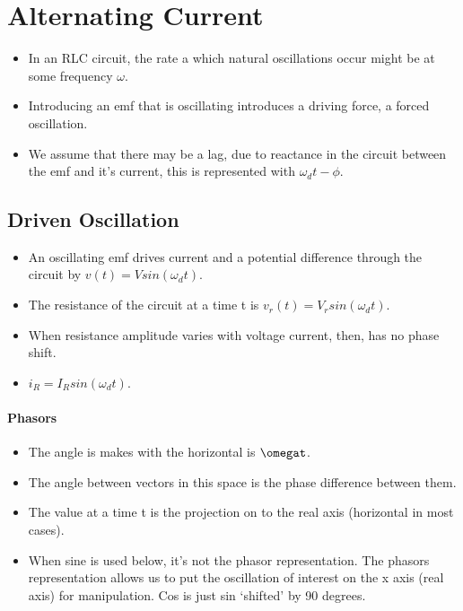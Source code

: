 \documentclass[11pt]{article}
\begin{document}
\hypertarget{alternating-current}{%
\section{Alternating Current}\label{alternating-current}}

\begin{itemize}
\tightlist
\item
  In an RLC circuit, the rate a which natural oscillations occur might
  be at some frequency \(\omega\).
\item
  Introducing an emf that is oscillating introduces a driving force, a
  forced oscillation.
\item
  We assume that there may be a lag, due to reactance in the circuit
  between the emf and it's current, this is represented with
  \(\omega_dt - \phi\).
\end{itemize}

\hypertarget{driven-oscillation}{%
\subsection{Driven Oscillation}\label{driven-oscillation}}

\begin{itemize}
\tightlist
\item
  An oscillating emf drives current and a potential difference through
  the circuit by \(v(t) = Vsin(\omega_dt)\).
\item
  The resistance of the circuit at a time t is
  \(v_r(t) = V_rsin(\omega_dt)\).
\item
  When resistance amplitude varies with voltage current, then, has no
  phase shift.
\item
  \(i_R = I_Rsin(\omega_dt)\).
\end{itemize}

\hypertarget{phasors}{%
\paragraph{Phasors}\label{phasors}}

\begin{itemize}
\tightlist
\item
  The angle is makes with the horizontal is \(\omegat\).
\item
  The angle between vectors in this space is the phase difference
  between them.
\item
  The value at a time t is the projection on to the real axis
  (horizontal in most cases).
\item
  When sine is used below, it's not the phasor representation. The
  phasors representation allows us to put the oscillation of interest on
  the x axis (real axis) for manipulation. Cos is just sin `shifted' by
  90 degrees.
\end{itemize}
\end{document}
